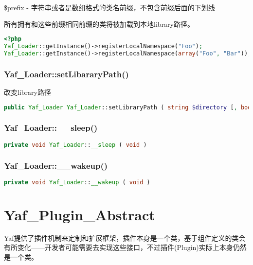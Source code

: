 \begin{compactitem}
\item \$prefix - 字符串或者是数组格式的类名前缀，不包含前缀后面的下划线

所有拥有和这些前缀相同前缀的类将被加载到本地library路径。
\end{compactitem}

\begin{lstlisting}[language=PHP]
<?php
Yaf_Loader::getInstance()->registerLocalNamespace("Foo");
Yaf_Loader::getInstance()->registerLocalNamespace(array("Foo", "Bar"));
\end{lstlisting}


\subsection{Yaf\_Loader::setLibararyPath()}

改变library路径

\begin{lstlisting}[language=PHP]
public Yaf_Loader Yaf_Loader::setLibraryPath ( string $directory [, bool $is_global = false ] )
\end{lstlisting}

\subsection{Yaf\_Loader::\_\_sleep()}

\begin{lstlisting}[language=PHP]
private void Yaf_Loader::__sleep ( void )
\end{lstlisting}

\subsection{Yaf\_Loader::\_\_wakeup()}


\begin{lstlisting}[language=PHP]
private void Yaf_Loader::__wakeup ( void )
\end{lstlisting}





\chapter{Yaf\_Plugin\_Abstract}

Yaf提供了插件机制来定制和扩展框架，插件本身是一个类，基于组件定义的类会有所变化——开发者可能需要去实现这些接口，不过插件(Plugin)实际上本身仍然是一个类。


